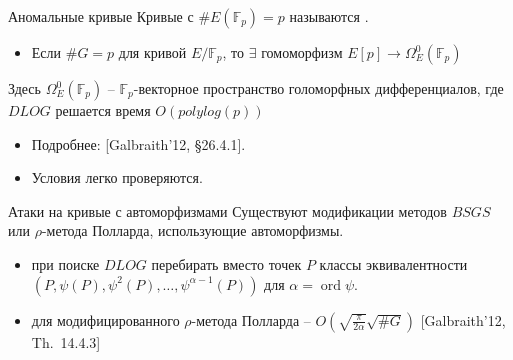\documentclass{beamer}
\begin{document}
\begin{frame}{Аномальные кривые}
Кривые с $\#E(\mathbb{F}_p) = p$ называются .
\begin{itemize}
    \item Если $\#G = p$ для кривой $E/\mathbb{F}_p$, то $\exists$ гомоморфизм $E[p] \rightarrow \Omega^0_E(\mathbb{F}_p)$
\end{itemize}
\vspace{0.5em}
Здесь $\Omega^0_E(\mathbb{F}_p)$ -- $\mathbb{F}_p$-векторное пространство голоморфных дифференциалов, где $DLOG$ решается время $O(polylog(p))$
\vspace{0.5em}
\begin{itemize}
    \item Подробнее: [Galbraith'12, \S26.4.1].
    \item Условия легко проверяются.
\end{itemize}
\end{frame}

%

\begin{frame}{Атаки на кривые с автоморфизмами}
Существуют модификации методов $BSGS$ или $\rho$-метода Полларда, использующие автоморфизмы.

\begin{itemize}
    \item {} при поиске $DLOG$ перебирать вместо точек $P$ классы эквивалентности $(P, \psi(P), \psi^2(P), \ldots, \psi^{\alpha-1}(P))$ для $\alpha = \operatorname{ord}{\psi}$.
    \item {} для модифицированного $\rho$-метода Полларда -- $O(\sqrt{\frac{\pi}{2\alpha}}\sqrt{\#G})$ [Galbraith'12, Th.~14.4.3]
\end{itemize}
\end{frame}
\end{document}
